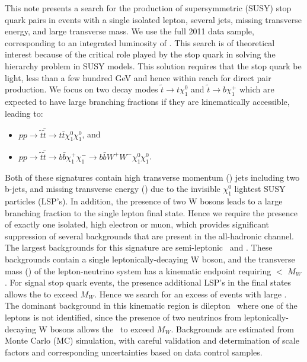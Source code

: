 
This note presents a search for the production of supersymmetric (SUSY) stop quark pairs in events with a 
single isolated lepton, several jets, missing transverse energy, and large transverse mass. We use the full 
2011 data sample, corresponding to an integrated luminosity of \lumi. 
This search is of theoretical interest because of the critical role played 
by the stop quark in solving the hierarchy problem in SUSY models. This solution requires that the stop quark 
be light, less than a few hundred GeV and hence within reach for direct pair production. We focus on two decay modes 
$\tilde{t}\rightarrow t\chi^0_1$ and $\tilde{t}\rightarrow b \chi^+_1$  which are expected
to have large branching fractions if they are kinematically accessible, leading to:

\begin{itemize}
\item $pp\rightarrow\tilde{t}\bar{\tilde{t}}\rightarrow t\bar{t}\chi^0_1\chi^0_1$, and
\item $pp\rightarrow\tilde{t}\bar{\tilde{t}}\rightarrow b\bar{b}\chi^+_1\chi^-_1 \rightarrow b\bar{b}W^+W^-\chi^0_1\chi^0_1$.
\end{itemize}

Both of these signatures contain high transverse momentum (\pt) jets including two b-jets, and missing transverse 
energy (\met) due to the invisible $\chi^0_1$ lightest SUSY particles (LSP's). In addition, the presence of
two W bosons leads to a large branching fraction to the single lepton final state. Hence we require the presence
of exactly one isolated, high \pt electron or muon, which provides significant suppression of several backgrounds
that are present in the all-hadronic channel. The largest backgrounds for this signature are semi-leptonic \ttbar\
and \wjets. These backgrounds contain a single leptonically-decaying W boson, and the transverse mass (\mt)
of the lepton-neutrino system has a kinematic endpoint requiring \mt $<$ $M_W$. For signal stop quark events,
the presence additional LSP's in the final states allows the \mt to exceed $M_W$. Hence we search for an excess
of events with large \mt. The dominant background in this kinematic region is dilepton \ttbar\ where one of the
leptons is not identified, since the presence of two neutrinos from leptonically-decaying W bosons allows the 
\mt\ to exceed $M_W$. Backgrounds are estimated from Monte Carlo (MC) simulation, with careful validation 
and determination of scale factors and corresponding uncertainties based on data control samples.

